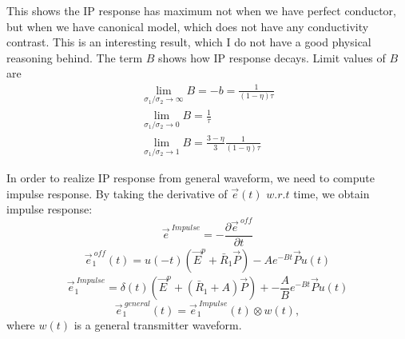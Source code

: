 \documentclass[a4paper, 11pt]{article}
\newcommand {\E}{{\vec E}}
\newcommand {\e}  { {\vec e} }
\begin{document}
This shows the IP response has maximum not when we have perfect conductor, but when we have canonical model, which does not have any conductivity contrast. This is an interesting result, which I do not have a good physical reasoning behind. 
The term $B$ shows how IP response decays. Limit values of $B$ are 
\begin{align}
	\lim_{ \sigma_1/ \sigma_2 \to\infty} B = -b = \frac{1}{(1-\eta)\tau}\\
	\lim_{ \sigma_1/ \sigma_2 \to0} B = \frac{1}{\tau} \\
	\lim_{ \sigma_1/ \sigma_2 \to1} B = \frac{3-\eta}{3}\frac{1}{(1-\eta)\tau}
\end{align}

In order to realize IP response from general waveform, we need to compute impulse response. By taking the derivative of $\e(t)$ $w.r.t$ time, we obtain impulse response:
\begin{equation*}
	\e^{ \ Impulse} = -\frac{\partial \e^{\ off}}{\partial t }
\end{equation*}
\begin{align*}
	\e^{\ off}_1(t) = u(-t)(\E^p+\bar{R}_1 \vec{P})  - Ae^{-Bt}\vec{P}u(t)
\end{align*}
\begin{equation*}
	\e^{ \ Impulse}_1 =  \delta(t)(\E^p+(\bar{R}_1+A) \vec{P})  +-\frac{A}{B}e^{-Bt}\vec{P}u(t)
\end{equation*}
\begin{equation*}
	\e^{ \ general}_1(t) =  \e^{ \ Impulse}_1(t) \otimes w(t),
\end{equation*}
where $w(t)$ is a general transmitter waveform. 
\end{document}

